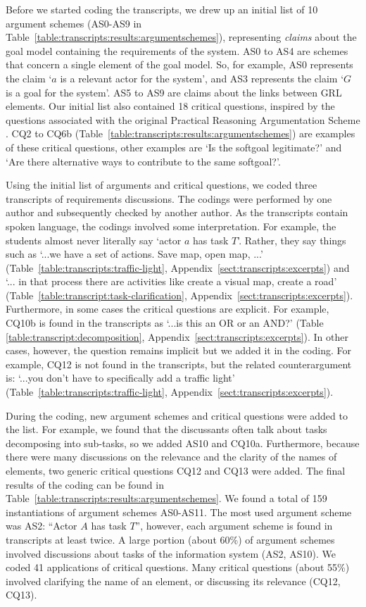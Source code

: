 Before we started coding the transcripts, we drew up an initial list of 10 argument schemes (AS0-AS9 in Table~\ref{table:transcripts:results:argumentschemes}), representing \emph{claims} about the goal model containing the requirements of the system. AS0 to AS4 are schemes that concern a single element of the goal model. So, for example, AS0 represents the claim `$a$ is a relevant actor for the system', and AS3 represents the claim `$G$ is a goal for the system'. AS5 to AS9 are claims about the links between GRL elements. Our initial list also contained 18 critical questions, inspired by the questions associated with the original Practical Reasoning Argumentation Scheme \cite{atkinson2007}. CQ2 to CQ6b (Table~\ref{table:transcripts:results:argumentschemes}) are examples of these critical questions, other examples are `Is the softgoal legitimate?' and `Are there alternative ways to contribute to the same softgoal?'.

Using the initial list of arguments and critical questions, we coded three transcripts of requirements discussions. The codings were performed by one author and subsequently checked by another author. As the transcripts contain spoken language, the codings involved some interpretation. For example, the students almost never literally say `actor $a$ has task $T$'. Rather, they say things such as `...we have a set of actions. Save map, open map, ...' (Table~\ref{table:transcripts:traffic-light}, Appendix~\ref{sect:transcripts:excerpts}) and `... in that process there are activities like create a visual map, create a road' (Table~\ref{table:transcript:task-clarification}, Appendix~\ref{sect:transcripts:excerpts}). Furthermore, in some cases the critical questions are explicit. For example, CQ10b is found in the transcripts as `...is this an OR or an AND?' (Table \ref{table:transcript:decomposition}, Appendix~\ref{sect:transcripts:excerpts}). In other cases, however, the question remains implicit but we added it in the coding. For example, CQ12 is not found in the transcripts, but the related counterargument is:  `...you don't have to specifically add a traffic light' (Table~\ref{table:transcripts:traffic-light}, Appendix~\ref{sect:transcripts:excerpts}). 

During the coding, new argument schemes and critical questions were added to the list. For example, we found that the discussants often talk about tasks decomposing into sub-tasks, so we added AS10 and CQ10a. Furthermore, because there were many discussions on the relevance and the clarity of the names of elements, two generic critical questions CQ12 and CQ13 were added. The final results of the coding can be found in Table~\ref{table:transcripts:results:argumentschemes}. We found a total of 159 instantiations of argument schemes AS0-AS11. The most used argument scheme was AS2: ``Actor $A$ has task $T$'', however, each argument scheme is found in transcripts at least twice. A large portion (about 60\%) of argument schemes involved discussions about tasks of the information system (AS2, AS10). We coded 41 applications of critical questions. Many critical questions (about 55\%) involved clarifying the name of an element, or discussing its relevance (CQ12, CQ13).

